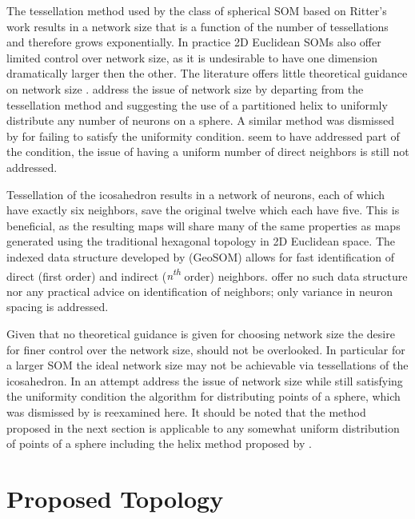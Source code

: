 \documentclass[12pt]{article}
\begin{document}
The tessellation method used by the class of spherical SOM based on Ritter's
work results in a network size that is a function of the number of
tessellations and therefore grows exponentially. In practice 2D Euclidean SOMs
also offer limited control over network size, as it is undesirable to have one
dimension dramatically larger then the other.  The literature offers little
theoretical guidance on network size \citep{cho1996}.  \cite{Nishio:2006fk}
address the issue of network size by departing from the tessellation method
and suggesting the use of a partitioned helix to uniformly distribute any
number of neurons on a sphere.  A similar method was dismissed by
\cite{wu2005} for failing to satisfy the uniformity condition.
\citeauthor{Nishio:2006fk} seem to have addressed part of the condition, the
issue of having a uniform number of direct neighbors is still not addressed.

Tessellation of the icosahedron results in a network of neurons, each of which
have exactly six neighbors, save the original twelve which each have five.
This is beneficial, as the resulting maps will share many of the same
properties as maps generated using the traditional hexagonal topology in 2D
Euclidean space. The indexed data structure developed by
\citeauthor{Wu:2006lr} (GeoSOM) allows for fast identification of direct
(first order) and indirect (\textit{n\textsuperscript{th}} order) neighbors.
\cite{Nishio:2006fk} offer no such data structure nor any practical advice on
identification of neighbors; only variance in neuron spacing is addressed.

Given that no theoretical guidance is given for choosing network size the
desire for finer control over the network size, should not be overlooked. In
particular for a larger SOM the ideal network size may not be achievable via
tessellations of the icosahedron.  In an attempt address the issue of network
size while still satisfying the uniformity condition the \cite{Rakhmanov94}
algorithm for distributing points of a sphere, which was dismissed by
\cite{wu2005} is reexamined here.  It should be noted that the method proposed
in the next section is applicable to any somewhat uniform distribution of
points of a sphere including the helix method proposed by
\cite{Nishio:2006fk}.

\section{Proposed Topology}
\end{document}
